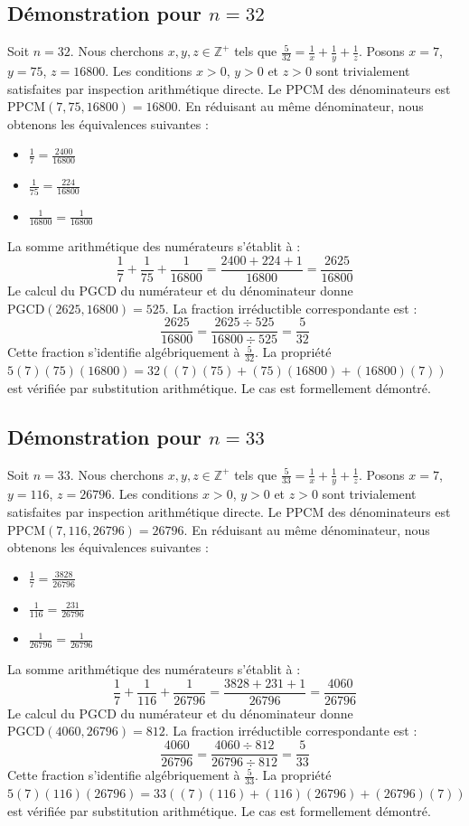 \documentclass[12pt,a4paper]{article}
\begin{document}
\subsection{Démonstration pour $n = 32$}
Soit $n = 32$. Nous cherchons $x, y, z \in \mathbb{Z}^{+}$ tels que $\frac{5}{32} = \frac{1}{x} + \frac{1}{y} + \frac{1}{z}$.
Posons $x = 7$, $y = 75$, $z = 16800$.
Les conditions $x > 0$, $y > 0$ et $z > 0$ sont trivialement satisfaites par inspection arithmétique directe.
Le PPCM des dénominateurs est $\text{PPCM}(7, 75, 16800) = 16800$.
En réduisant au même dénominateur, nous obtenons les équivalences suivantes :
\begin{itemize}
    \item $\frac{1}{7} = \frac{2400}{16800}$
    \item $\frac{1}{75} = \frac{224}{16800}$
    \item $\frac{1}{16800} = \frac{1}{16800}$
\end{itemize}
La somme arithmétique des numérateurs s'établit à :
$$ \frac{1}{7} + \frac{1}{75} + \frac{1}{16800} = \frac{2400 + 224 + 1}{16800} = \frac{2625}{16800} $$
Le calcul du PGCD du numérateur et du dénominateur donne $\text{PGCD}(2625, 16800) = 525$.
La fraction irréductible correspondante est :
$$ \frac{2625}{16800} = \frac{2625 \div 525}{16800 \div 525} = \frac{5}{32} $$
Cette fraction s'identifie algébriquement à $\frac{5}{32}$.
La propriété $5(7)(75)(16800) = 32((7)(75) + (75)(16800) + (16800)(7))$ est vérifiée par substitution arithmétique.
Le cas est formellement démontré.

\subsection{Démonstration pour $n = 33$}
Soit $n = 33$. Nous cherchons $x, y, z \in \mathbb{Z}^{+}$ tels que $\frac{5}{33} = \frac{1}{x} + \frac{1}{y} + \frac{1}{z}$.
Posons $x = 7$, $y = 116$, $z = 26796$.
Les conditions $x > 0$, $y > 0$ et $z > 0$ sont trivialement satisfaites par inspection arithmétique directe.
Le PPCM des dénominateurs est $\text{PPCM}(7, 116, 26796) = 26796$.
En réduisant au même dénominateur, nous obtenons les équivalences suivantes :
\begin{itemize}
    \item $\frac{1}{7} = \frac{3828}{26796}$
    \item $\frac{1}{116} = \frac{231}{26796}$
    \item $\frac{1}{26796} = \frac{1}{26796}$
\end{itemize}
La somme arithmétique des numérateurs s'établit à :
$$ \frac{1}{7} + \frac{1}{116} + \frac{1}{26796} = \frac{3828 + 231 + 1}{26796} = \frac{4060}{26796} $$
Le calcul du PGCD du numérateur et du dénominateur donne $\text{PGCD}(4060, 26796) = 812$.
La fraction irréductible correspondante est :
$$ \frac{4060}{26796} = \frac{4060 \div 812}{26796 \div 812} = \frac{5}{33} $$
Cette fraction s'identifie algébriquement à $\frac{5}{33}$.
La propriété $5(7)(116)(26796) = 33((7)(116) + (116)(26796) + (26796)(7))$ est vérifiée par substitution arithmétique.
Le cas est formellement démontré.
\end{document}
